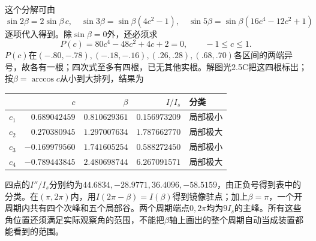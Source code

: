 \documentclass[UTF8,fontset=fandol,a4paper,11pt]{ctexart}
\begin{document}
这个分解可由
\[
\sin2\beta=2\sin\beta\,c,\quad
\sin3\beta=\sin\beta(4c^2-1),\quad
\sin5\beta=\sin\beta(16c^4-12c^2+1)
\]
逐项代入得到。除$\sin\beta=0$外，还必须求
\[
P(c)=80c^4-48c^2+4c+2=0,\qquad -1\le c\le1 .
\]
$P(c)$在$(-.80,-.78),(-.18,-.16),(.26,.28),(.68,.70)$各区间的两端异号，故各有一根；四次式至多有四根，已无其他实根。解图光2.5C把这四根标出；按$\beta=\arccos c$从小到大排列，结果为
\begin{center}
\begin{tabular}{c r r r l}
\toprule
 & $c$ & $\beta$ & $I/I_s$ & 分类\\
\midrule
$c_1$ & $0.689042459$ & $0.810629361$ & $0.156973209$ & 局部极小\\
$c_2$ & $0.270380945$ & $1.297007634$ & $1.787662770$ & 局部极大\\
$c_3$ & $-0.169979560$ & $1.741605254$ & $0.588272450$ & 局部极小\\
$c_4$ & $-0.789443845$ & $2.480698744$ & $6.267091571$ & 局部极大\\
\bottomrule
\end{tabular}
\end{center}
四点的$I''/I_s$分别约为$44.6834,-28.9771,36.4096,-58.5159$，由正负号得到表中的分类。在$(\pi,2\pi)$内，用$I(2\pi-\beta)=I(\beta)$得到镜像驻点；加上$\beta=\pi$，一个开周期内共有四个次峰和五个局部谷。两个周期端点$0,2\pi$均为$9I_s$的主峰。所有这些角位置还须满足实际观察角的范围，不能把$\beta$轴上画出的整个周期自动当成装置都能看到的范围。
\end{document}
